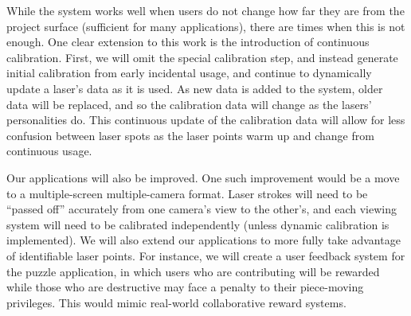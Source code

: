 \documentclass[review]{vgtc}                 %
\begin{document}
While the system works well when users do not change how far they are from the project surface (sufficient for 
many applications), there are times when this is not enough. One clear extension to this work is the introduction 
of continuous calibration. First, we will omit the special calibration step, and instead generate initial 
calibration from early incidental usage, and continue to dynamically update a laser's data as it is used. As 
new data is added to the system, older data will be replaced, and so the calibration data will change as the 
lasers' personalities do. This continuous update of the calibration data will allow for less confusion between 
laser spots as the laser points warm up and change from continuous usage. 

Our applications will also be improved. One such improvement would be a move to a multiple-screen multiple-camera 
format. Laser strokes will need to be ``passed off'' accurately from one camera's view to the other's, and each 
viewing system will need to be calibrated independently (unless dynamic calibration is implemented). We will also 
extend our applications to more fully take advantage of identifiable laser points. For instance, we will create 
a user feedback system for the puzzle application, in which users who are contributing will be rewarded while 
those who are destructive may face a penalty to their piece-moving privileges. This would mimic real-world collaborative reward systems.




\end{document}
